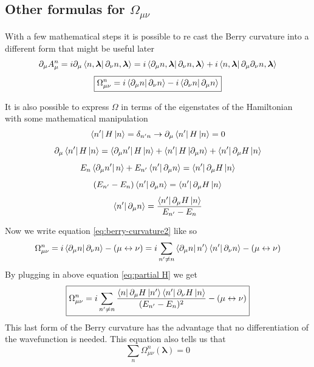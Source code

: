 \documentclass[11pt,a4paper]{report}
\theoremstyle{definition}
\theoremstyle{plain}
\theoremstyle{plain}
\begin{document}
		\subsection{Other formulas for $\Omega_{\mu\nu}$}
		
			With a few mathematical steps it is possible to re cast the Berry curvature into a different form that might be useful later
			\[
				\partial_\mu A^n_\mu =i\partial_\mu \bra{n,\boldsymbol \lambda}\partial_\nu n,\boldsymbol \lambda \rangle= 
				i\bra{\partial_\mu n,\boldsymbol \lambda}\partial_\nu n,\boldsymbol \lambda \rangle + i\bra{n,\boldsymbol \lambda}\partial_\mu\partial_\nu n,\boldsymbol \lambda \rangle
			\]
			\begin{equation}
				\label{eq:berry-curvature2}
					\boxed{\Omega_{\mu\nu}^n =i\bra{\partial_\mu n}\partial_\nu n\rangle - i\bra{\partial_\nu n}\partial_\mu n\rangle}
			\end{equation}
		
		
			It is also possible to express $\Omega$ in terms of the eigenstates of the Hamiltonian with some mathematical manipulation
			\[
				\bra{n'} H \ket{n}=\delta_{n'n} \to \partial_\mu \bra{n'} H \ket{n}=0
			\]
			\[
			\partial_\mu \bra{n'} H \ket{n}=\bra{\partial_\mu n'}H\ket{n} + \bra{n'}H\ket{\partial_\mu n} + \bra{n'} \partial_\mu H\ket{n}
			\]
			\[
				E_{n}\bra{\partial_\mu n'}n\rangle + E_{n'} \bra{n'}\partial_\mu n\rangle=\bra{n'} \partial_\mu H\ket{n}
			\]
			\[
				(E_{n'}-E_n)\bra{n'} \partial_\mu n\rangle=\bra{n'} \partial_\mu H\ket{n}
			\]
			\begin{equation}
				\label{eq:partial H}
					\bra{n'}\partial_\mu n\rangle=  \frac{\bra{n'} \partial_\mu H\ket{n}}{E_{n'}-E_n}
			\end{equation}

			Now we write equation \ref{eq:berry-curvature2} like so
			\[
				\Omega_{\mu\nu}^n =i\bra{\partial_\mu n}\partial_\nu n\rangle - (\mu \leftrightarrow \nu)= i\sum_{n'\neq n}\bra{\partial_\mu n}n'\rangle\bra{n'}\partial_\nu n\rangle - (\mu \leftrightarrow \nu)
			\]
			By plugging in above equation \ref{eq:partial H} we get
			\begin{equation}
				\label{eq:berry-curvature3}
				\boxed{\Omega_{\mu\nu}^n=i\sum_{n'\neq n} \frac{\bra{n}\partial_\mu H\ket{n'}\bra{n'} \partial_\nu H\ket{n}}{(E_{n'}-E_n)^2}- (\mu \leftrightarrow \nu)}
			\end{equation}
			This last form of the Berry curvature has the advantage that no differentiation of the wavefunction is needed. This equation also tells us that
			\[ \sum_n \Omega_{\mu\nu}^n (\boldsymbol \lambda)=0 \]
\end{document}
